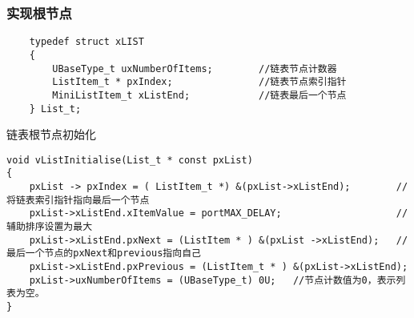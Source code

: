 \documentclass[11pt,a4paper]{ctexart}
\begin{document}
\subsubsection{实现根节点}
\begin{lstlisting}
	typedef struct xLIST
	{
		UBaseType_t uxNumberOfItems;        //链表节点计数器
		ListItem_t * pxIndex;               //链表节点索引指针
		MiniListItem_t xListEnd;            //链表最后一个节点
	} List_t;
\end{lstlisting}

链表根节点初始化
\begin{lstlisting}
void vListInitialise(List_t * const pxList)
{
	pxList -> pxIndex = ( ListItem_t *) &(pxList->xListEnd);        //将链表索引指针指向最后一个节点
	pxList->xListEnd.xItemValue = portMAX_DELAY;                    //辅助排序设置为最大
	pxList->xListEnd.pxNext = (ListItem * ) &(pxList ->xListEnd);   //最后一个节点的pxNext和previous指向自己
	pxList->xListEnd.pxPrevious = (ListItem_t * ) &(pxList->xListEnd);
	pxList->uxNumberOfItems = (UBaseType_t) 0U;   //节点计数值为0，表示列表为空。
}
\end{lstlisting}
\end{document}
